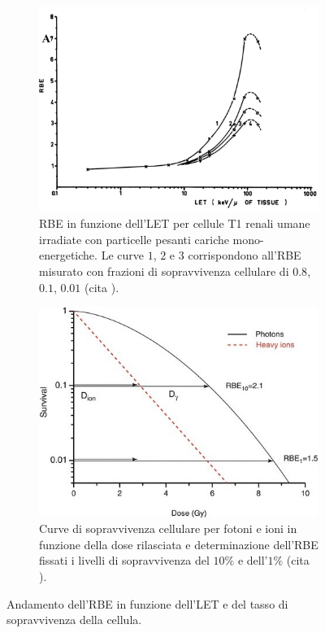 \documentclass[12pt,a4paper,twoside]{report}
\begin{document}
	\begin{figure}[H]
		\centering
		\begin{subfigure}[t]{0.49\textwidth}
			\centering
 			\includegraphics[width=\textwidth, scale=0.5]{images/let_rbe1.png}
			\caption{RBE in funzione dell'LET per cellule T1 renali umane irradiate con particelle pesanti cariche mono-energetiche. Le curve $1$, $2$ e $3$ corrispondono all'RBE misurato con frazioni di sopravvivenza cellulare di $0.8$, $0.1$, $0.01$ (cita
				).}
			\label{fig:let_rbe}
		\end{subfigure}
		\hfill
		\begin{subfigure}[t]{0.49\textwidth}
			\centering
			\includegraphics[width=\textwidth, scale=0.5]{images/survival_dose.jpg}
			\caption{Curve di sopravvivenza cellulare per fotoni e ioni in funzione della dose rilasciata e determinazione dell'RBE fissati i livelli di sopravvivenza del $10\%$ e dell'$1\%$ (cita
				).}
			\label{fig:survival_dose}
		\end{subfigure}
		\caption{Andamento dell'RBE in funzione dell'LET e del tasso di sopravvivenza della cellula.}
	\end{figure}
		
\end{document}
